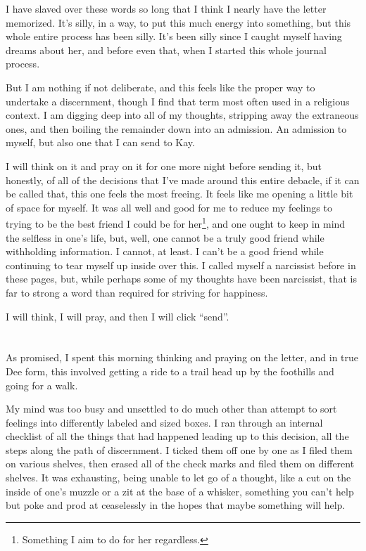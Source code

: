 I have slaved over these words so long that I think I nearly have the letter memorized. It's silly, in a way, to put this much energy into something, but this whole entire process has been silly. It's been silly since I caught myself having dreams about her, and before even that, when I started this whole journal process.

But I am nothing if not deliberate, and this feels like the proper way to undertake a discernment, though I find that term most often used in a religious context. I am digging deep into all of my thoughts, stripping away the extraneous ones, and then boiling the remainder down into an admission. An admission to myself, but also one that I can send to Kay.

I will think on it and pray on it for one more night before sending it, but honestly, of all of the decisions that I've made around this entire debacle, if it can be called that, this one feels the most freeing. It feels like me opening a little bit of space for myself. It was all well and good for me to reduce my feelings to trying to be the best friend I could be for her\footnote{Something I aim to do for her regardless.}, and one ought to keep in mind the selfless in one's life, but, well, one cannot be a truly good friend while withholding information. I cannot, at least. I can't be a good friend while continuing to tear myself up inside over this. I called myself a narcissist before in these pages, but, while perhaps some of my thoughts have been narcissist, that is far to strong a word than required for striving for happiness.

I will think, I will pray, and then I will click ``send''.

\section{}

As promised, I spent this morning thinking and praying on the letter, and in true Dee form, this involved getting a ride to a trail head up by the foothills and going for a walk.

My mind was too busy and unsettled to do much other than attempt to sort feelings into differently labeled and sized boxes. I ran through an internal checklist of all the things that had happened leading up to this decision, all the steps along the path of discernment. I ticked them off one by one as I filed them on various shelves, then erased all of the check marks and filed them on different shelves. It was exhausting, being unable to let go of a thought, like a cut on the inside of one's muzzle or a zit at the base of a whisker, something you can't help but poke and prod at ceaselessly in the hopes that maybe something will help.

